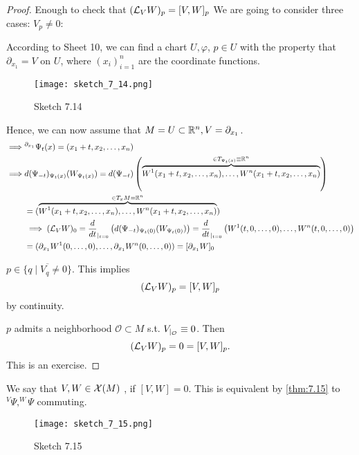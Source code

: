 \begin{proof}
    Enough to check that \((\mathcal{L}_VW)_p=[V,W]_p\)
    We are going to consider three cases:
     \(V_p\neq 0\):

     According to Sheet 10, we can find a chart \(U,\varphi\), \(p\in U\) with the property 
    that \(\partial_{x_1}=V\) on \(U\), where \((x_i)_{i=1}^n\) are the coordinate functions.
    \begin{figure}[H]\label{fig:7.14}
        \centering
        \texttt{[image: sketch\_7\_14.png]}
        \caption{Sketch 7.14}
    \end{figure}
    Hence, we can now assume that \(M=U\subset\mathbb{R}^n,V=\partial_{x_1}\).  %
    \begin{align*}
        \implies& {}^{\partial_{x_1}}\Psi_t(x)=(x_1+t,x_2,\dots,x_n)\\
        \implies& d(\Psi_{-t})_{\Psi_t(x)}(W_{\Psi_t(x)})=d(\Psi_{-t})\left(\overbrace{W^1(x_1+t,x_2,\dots,x_n),\dots,W^n(x_1+t,x_2,\dots,x_n)}^{\in T_{\Psi_t(x)}\equiv \mathbb{R}^n}\right)\\
        &=(\overbrace{W^1(x_1+t,x_2,\dots,x_n),\dots,W^n(x_1+t,x_2,\dots,x_n)}^{\in T_x M=\mathbb{R}^n})\\
        &\implies (\mathcal{L}_V W)_0 =\frac{d}{dt}_{|_{t=0}}\left(d(\Psi_{-t})_{\Psi_t(0)}(W_{\Psi_t(0)})\right)=\frac{d}{dt}_{|_{t=0}}\left(W^1(t,0,\dots,0),\dots,W^n(t,0,\dots,0)\right)\\
        &= (\partial_{x_1}W^{1}(0,\dots,0),\dots,\partial_{x_1}W^{n}(0,\dots,0))=[\partial_{x_1}W]_0
    \end{align*}
    
     \(p\in \overline{\{q\mid V_q\neq 0\}}\). This implies 
    \[(\mathcal{L}_VW)_p=[V,W]_p\]
    by continuity.

     \(p\) admits a neighborhood \(\mathcal{O}\subset M\) s.t. \(V_{|_{\mathcal{O}}}\equiv 0\). Then 
    \[(\mathcal{L}_VW)_p=0=[V,W]_p.\]
    This is an exercise.
\end{proof}

 We say that \(V,W\in\mathcal{X}(M)\) , if \([V,W]=0\).
This is equivalent by \ref{thm:7.15} to \(^V\Psi,^W \Psi\) commuting.

\begin{figure}[H]\label{fig:7.15}
    \centering
    \texttt{[image: sketch\_7\_15.png]}
    \caption{Sketch 7.15}
\end{figure}

